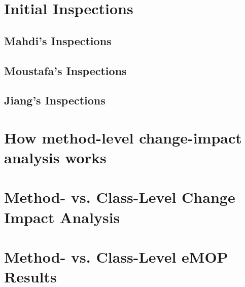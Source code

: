 \pagestyle{plain}

\appendix

\onecolumn

\section{Initial Inspections}

\subsection{Mahdi's Inspections}


\subsection{Moustafa's Inspections}


\subsection{Jiang's Inspections}


\section{How method-level change-impact analysis works}


\section{Method- vs. Class-Level Change Impact Analysis}


\section{Method- vs. Class-Level eMOP Results}
